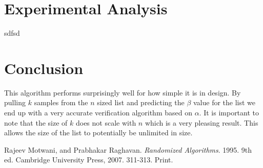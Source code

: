 \documentclass[11pt]{article}
\begin{document}
\section{Experimental Analysis}

sdfsd

\section{Conclusion}

This algorithm performs surprisingly well for how simple it is in design. By pulling $k$ samples from the $n$ sized list and predicting the $\beta$ value for the list we end up with a very accurate verification algorithm based on $\alpha$. It is important to note that the size of $k$ does not scale with $n$ which is a very pleasing result. This allows the size of the list to potentially be unlimited in size.  

\begin{thebibliography}{2}

Rajeev Motwani, and Prabhakar Raghavan.
\textit{Randomized Algorithms}. 1995. 9th ed.
Cambridge University Press, 2007.
311-313. Print.

\end{thebibliography}
\end{document}
